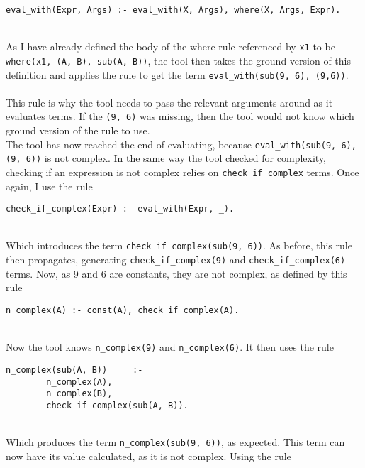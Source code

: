 \begin{lstlisting}
eval_with(Expr, Args) :- eval_with(X, Args), where(X, Args, Expr).
\end{lstlisting}
\mbox{} \\
As I have already defined the body of the where rule referenced by \lstinline{x1} to be \lstinline{where(x1, (A, B), sub(A, B))}, the tool then takes the ground version of this definition and applies the rule to get the term \lstinline{eval_with(sub(9, 6), (9,6))}. \\ \\%
This rule is why the tool needs to pass the relevant arguments around as it evaluates terms. If the \lstinline{(9, 6)} was missing, then the tool would not know which ground version of the rule to use.\\ %
The tool has now reached the end of evaluating, because \lstinline{eval_with(sub(9, 6), (9, 6))} is not complex. In the same way the tool checked for complexity, checking if an expression is not complex relies on \lstinline{check_if_complex} terms. Once again, I use the rule\\

\begin{lstlisting}
check_if_complex(Expr) :- eval_with(Expr, _).
\end{lstlisting}
\mbox{} \\
Which introduces the term \lstinline{check_if_complex(sub(9, 6))}. As before, this rule then propagates, generating \lstinline{check_if_complex(9)} and \lstinline{check_if_complex(6)} terms. Now, as 9 and 6 are constants, they are not complex, as defined by this rule \\ %

\begin{lstlisting}
n_complex(A) :- const(A), check_if_complex(A).
\end{lstlisting}
\mbox{} \\
Now the tool knows \lstinline{n_complex(9)} and \lstinline{n_complex(6)}. It then uses the rule \\ %

\begin{lstlisting}
n_complex(sub(A, B))     :- 
		n_complex(A), 
		n_complex(B), 
		check_if_complex(sub(A, B)).
\end{lstlisting}
\mbox{} \\
Which produces the term \lstinline{n_complex(sub(9, 6))}, as expected. This term can now have its value calculated, as it is not complex. Using the rule \\ %

